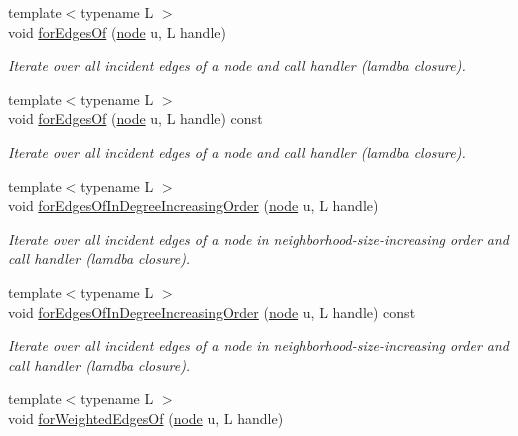 \begin{DoxyCompactItemize}
{\footnotesize template$<$typename L $>$ }\\void \hyperlink{class_networ_kit_1_1_graph_afc892cbb7e1df4a83c718decae4ad377}{for\-Edges\-Of} (\hyperlink{namespace_networ_kit_a53fe3e4fd04ea024160e4d024dfebadf}{node} u, L handle)
\begin{DoxyCompactList}\small\item\em Iterate over all incident edges of a node and call handler (lamdba closure). \end{DoxyCompactList}\item 
{\footnotesize template$<$typename L $>$ }\\void \hyperlink{class_networ_kit_1_1_graph_a7d7d282c67bbe28e5d38086f4a7ca2c9}{for\-Edges\-Of} (\hyperlink{namespace_networ_kit_a53fe3e4fd04ea024160e4d024dfebadf}{node} u, L handle) const 
\begin{DoxyCompactList}\small\item\em Iterate over all incident edges of a node and call handler (lamdba closure). \end{DoxyCompactList}\item 
{\footnotesize template$<$typename L $>$ }\\void \hyperlink{class_networ_kit_1_1_graph_a091bd146b97c5c17fd46450ef8577173}{for\-Edges\-Of\-In\-Degree\-Increasing\-Order} (\hyperlink{namespace_networ_kit_a53fe3e4fd04ea024160e4d024dfebadf}{node} u, L handle)
\begin{DoxyCompactList}\small\item\em Iterate over all incident edges of a node in neighborhood-\/size-\/increasing order and call handler (lamdba closure). \end{DoxyCompactList}\item 
{\footnotesize template$<$typename L $>$ }\\void \hyperlink{class_networ_kit_1_1_graph_a5c4134d956d28828d6c052ce2249c108}{for\-Edges\-Of\-In\-Degree\-Increasing\-Order} (\hyperlink{namespace_networ_kit_a53fe3e4fd04ea024160e4d024dfebadf}{node} u, L handle) const 
\begin{DoxyCompactList}\small\item\em Iterate over all incident edges of a node in neighborhood-\/size-\/increasing order and call handler (lamdba closure). \end{DoxyCompactList}\item 
{\footnotesize template$<$typename L $>$ }\\void \hyperlink{class_networ_kit_1_1_graph_a8ae088eb738bd7d985196a62f3e3b8a1}{for\-Weighted\-Edges\-Of} (\hyperlink{namespace_networ_kit_a53fe3e4fd04ea024160e4d024dfebadf}{node} u, L handle)

\end{DoxyCompactItemize}
